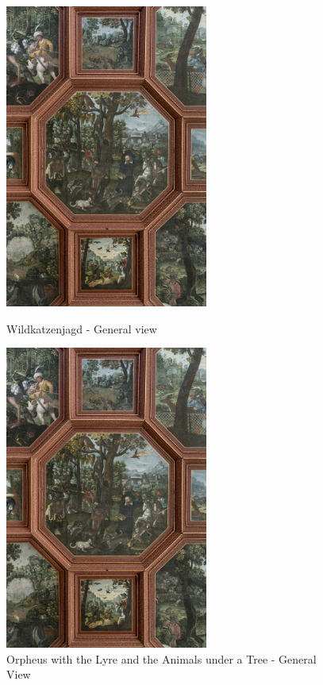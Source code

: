 \documentclass[
  a4paper,
]{book}
\begin{document}
\begin{figure}
\includegraphics[height=10cm]{images/fmd10024325a.jpg}

\caption{Wildkatzenjagd - General view}
\label{fig:{images/fmd10024325a.jpg}}

\clearpage

\centering

\includegraphics[height=10cm]{images/fmd10024325a.jpg}

\caption{Orpheus with the Lyre and the Animals under a Tree - General View}
\label{fig:{images/fmd10024325a.jpg}}

\clearpage

\centering


\end{figure}
\end{document}
